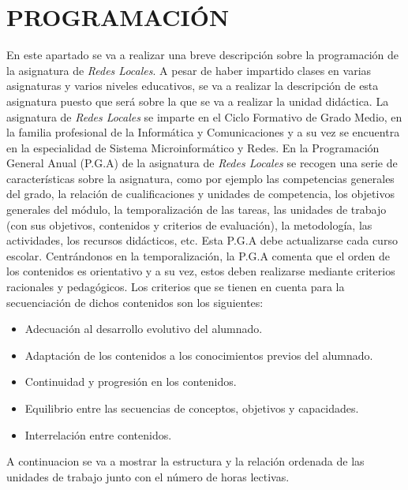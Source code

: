 \documentclass[spanish,12pt, a4paper,twoside]{paper}
\let\oldsection\section
\def\section{\cleardoublepage\oldsection}
\begin{document}
\section{PROGRAMACIÓN} %
\justify
En este apartado se va a realizar una breve descripción sobre la programación de la asignatura de \textit{Redes Locales}. A pesar de haber impartido clases en varias asignaturas y varios niveles educativos, se va a realizar la descripción de esta asignatura puesto que será sobre la que se va a realizar la unidad didáctica. 
\justify
La asignatura de \textit{Redes Locales} se imparte en el Ciclo Formativo de Grado Medio, en la familia profesional de la Informática y Comunicaciones y a su vez se encuentra en la especialidad de Sistema Microinformático y Redes.
\justify
En la Programación General Anual (P.G.A) de la asignatura de \textit{Redes Locales} se recogen una serie de características sobre la asignatura, como por ejemplo las competencias generales del grado, la relación de cualificaciones y unidades de competencia, los objetivos generales del módulo, la temporalización de las tareas, las unidades de trabajo (con sus objetivos, contenidos y criterios de evaluación), la metodología, las actividades, los recursos didácticos, etc. Esta P.G.A debe actualizarse cada curso escolar.
\justify
Centrándonos en la temporalización, la P.G.A comenta que el orden de los contenidos es orientativo y a su vez, estos deben realizarse mediante criterios racionales y pedagógicos.
\justify
Los criterios que se tienen en cuenta para la secuenciación de dichos contenidos son los siguientes:
\begin{itemize}
\item Adecuación al desarrollo evolutivo del alumnado.
\item Adaptación de los contenidos a los conocimientos previos del alumnado.
\item Continuidad y progresión en los contenidos.
\item Equilibrio entre las secuencias de conceptos, objetivos y capacidades.
\item Interrelación entre contenidos.
\end{itemize}
\justify
A continuacion se va a mostrar la estructura y la relación ordenada de las unidades de trabajo junto con el número de horas lectivas.
\end{document}
